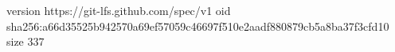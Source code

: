 version https://git-lfs.github.com/spec/v1
oid sha256:a66d35525b942570a69ef57059c46697f510e2aadf880879cb5a8ba37f3cfd10
size 337
